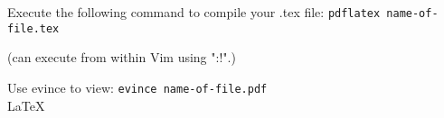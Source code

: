 \documentclass{article}
\begin{document}
Execute the following command to compile your .tex file:
\texttt{pdflatex name-of-file.tex}


(can execute from within Vim using ":!".)

\par Use evince to view:
\texttt{evince name-of-file.pdf}
\\
\LaTeX
\end{document}
